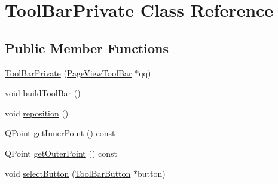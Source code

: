 \hypertarget{classToolBarPrivate}{\section{Tool\+Bar\+Private Class Reference}
\label{classToolBarPrivate}
}
\subsection*{Public Member Functions}
\begin{DoxyCompactItemize}
\item 
\hyperlink{classToolBarPrivate_a10215cc76c6981f253284b27e65f4843}{Tool\+Bar\+Private} (\hyperlink{classPageViewToolBar}{Page\+View\+Tool\+Bar} $\ast$qq)
\item 
void \hyperlink{classToolBarPrivate_a366a23393d27a7f6bcf53d621cd840f5}{build\+Tool\+Bar} ()
\item 
void \hyperlink{classToolBarPrivate_a40084a2dbecd2fa96b3f5734f78e8455}{reposition} ()
\item 
Q\+Point \hyperlink{classToolBarPrivate_a340c5f39dac2d33cd95b347af8498654}{get\+Inner\+Point} () const 
\item 
Q\+Point \hyperlink{classToolBarPrivate_a8e6b01a833282dc38d45f21a605bf44f}{get\+Outer\+Point} () const 
\item 
void \hyperlink{classToolBarPrivate_a00f798295d994dc7fb744958304bf0a1}{select\+Button} (\hyperlink{classToolBarButton}{Tool\+Bar\+Button} $\ast$button)
\end{DoxyCompactItemize}
